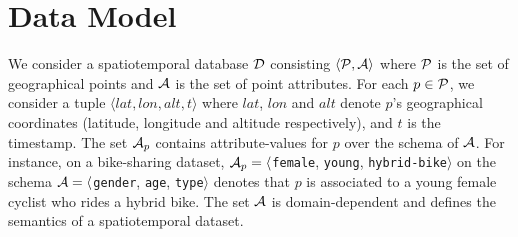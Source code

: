 \section{Data Model}\label{sec:data-model}

We consider a spatiotemporal database ${\cal D}$ consisting $\langle {\cal P}, {\cal A} \rangle$ where ${\cal P}$ is the set of
geographical points and ${\cal A}$ is the set of point attributes. For each $p \in {\cal P}$, we consider a tuple $\langle lat, lon, alt, t\rangle$ where $lat$, $lon$ and $alt$ denote $p$'s geographical coordinates (latitude, longitude and altitude respectively), and $t$ is the timestamp. The set ${\cal A}_p$ contains attribute-values for $p$ over the schema of ${\cal A}$. For instance, on a bike-sharing dataset, ${\cal A}_p = \langle${\tt female}, {\tt young}, {\tt hybrid-bike}$\rangle$ on the schema ${\cal A} = \langle${\tt gender}, {\tt age}, {\tt type}$\rangle$ denotes that $p$ is associated to a young female cyclist who rides a hybrid bike. The set ${\cal A}$ is domain-dependent and defines the semantics of a spatiotemporal dataset. 

